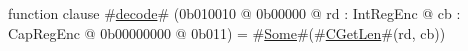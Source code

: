 function clause #\hyperref[sailMIPSzdecode]{decode}# (0b010010 @ 0b00000 @ rd : IntRegEnc @ cb : CapRegEnc @ 0b00000000 @ 0b011) = #\hyperref[sailMIPSzSome]{Some}#(#\hyperref[sailMIPSzCGetLen]{CGetLen}#(rd, cb))
